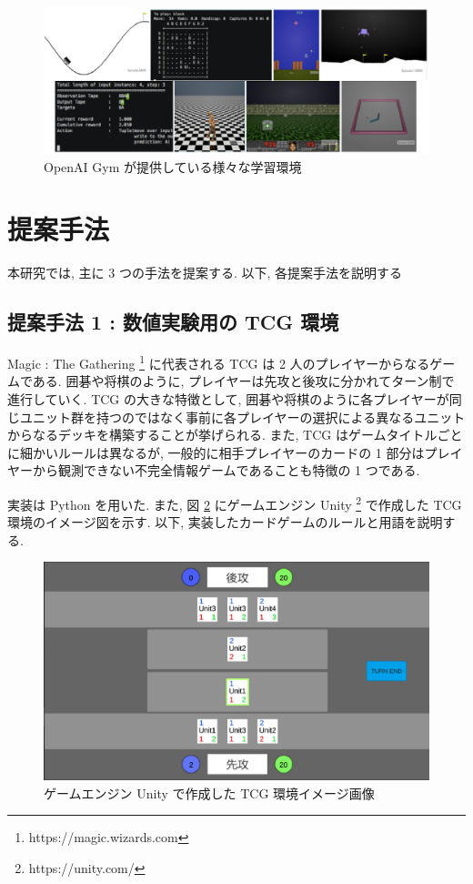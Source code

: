 \documentclass[12pt]{jarticle}
\begin{document}
  \begin{figure}[ht]
    \centering
    \includegraphics[width=150mm]{assets/OpenAiGym.eps}
    \vspace{-0.3cm}
    \caption{OpenAI Gym が提供している様々な学習環境}
    \label{fig:OpenAIGymSample}
  \end{figure}
  

\clearpage
\section{提案手法}
本研究では, 主に 3 つの手法を提案する. 以下, 各提案手法を説明する

\subsection{提案手法 1 : 数値実験用の TCG 環境}
Magic : The Gathering \footnote[1]{https://magic.wizards.com} に代表される TCG は 2 人のプレイヤーからなるゲームである. 囲碁や将棋のように, プレイヤーは先攻と後攻に分かれてターン制で進行していく. TCG の大きな特徴として, 囲碁や将棋のように各プレイヤーが同じユニット群を持つのではなく事前に各プレイヤーの選択による異なるユニットからなるデッキを構築することが挙げられる. また, TCG はゲームタイトルごとに細かいルールは異なるが, 一般的に相手プレイヤーのカードの 1 部分はプレイヤーから観測できない不完全情報ゲームであることも特徴の 1 つである. 

実装は Python を用いた.
また, 図 \ref{fig:CardGameDemo} にゲームエンジン Unity \footnote[2]{https://unity.com/} で作成した TCG 環境のイメージ図を示す.
以下, 実装したカードゲームのルールと用語を説明する. 
\vspace{-0.3cm}
\begin{figure}[ht]
  \centering
  \includegraphics[width=170mm]{assets/cardgamedemo.eps}
  \vspace{-0.3cm}
  \caption{ゲームエンジン Unity で作成した TCG 環境イメージ画像}
  \label{fig:CardGameDemo}
\end{figure}
\end{document}
